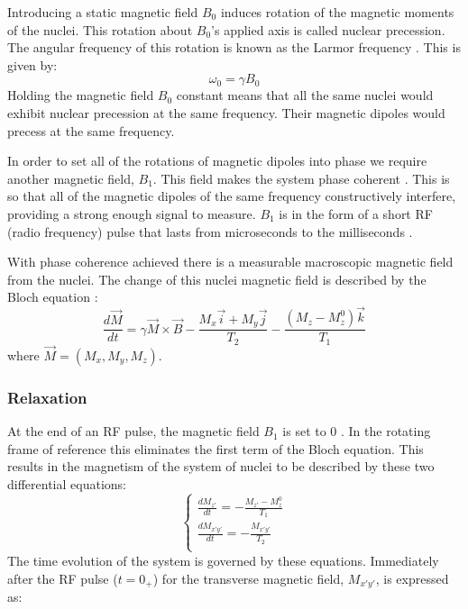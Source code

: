 Introducing a static magnetic field $B_0$ induces rotation of the magnetic moments of the nuclei. This rotation about $B_0$'s applied axis is called nuclear precession. The angular frequency of this rotation is known as the Larmor frequency  \cite{NMRSignalProcessingBook}. This is given by: 
\begin{equation}
    \omega_0 = \gamma B_0
    \label{ref:LarmorFreq}
\end{equation}
Holding the magnetic field $B_0$ constant means that all the same nuclei would exhibit nuclear precession at the same frequency. Their magnetic dipoles would precess at the same frequency.

In order to set all of the rotations of magnetic dipoles into phase we require another magnetic field, $B_1$. This field makes the system phase coherent  \cite{NMRSignalProcessingBook}. This is so that all of the magnetic dipoles of the same frequency constructively interfere, providing a strong enough signal to measure. $B_1$ is in the form of a short RF (radio frequency) pulse that lasts from microseconds to the milliseconds  \cite{NMRSignalProcessingBook}.

With phase coherence achieved there is a measurable macroscopic magnetic field from the nuclei. The change of this nuclei magnetic field is described by the Bloch equation  \cite{NMRSignalProcessingBook}:
\begin{equation}
    \frac{d\vec{M}}{dt} = \gamma \vec{M} \times \vec{B} - \frac{M_{x}\vec{i} + M_{y}\vec{j}}{T_2} - \frac{(M_z - M_{z}^0)\vec{k}}{T_1}
    \label{eq:blochEquation}
\end{equation}
where $\vec{M} = (M_x, M_y, M_z)$.
\subsubsection{Relaxation}

At the end of an RF pulse, the magnetic field $B_1$ is set to 0  \cite{NMRSignalProcessingBook}. In the rotating frame of reference this eliminates the first term of the Bloch equation. This results in the magnetism of the system of nuclei to be described by these two differential equations:
\begin{equation}
    \begin{cases}
          \frac{dM_{z'}}{dt}    =         -\frac{M_{z'} - M_{z}^0}{T_1}  \\
           \frac{dM_{x'y'}}{dt}    =         -\frac{M_{x'y'}}{T_2}  \\         
    \end{cases}
\end{equation}
The time evolution of the system is governed by these equations. Immediately after the RF pulse ($t = 0_+$) for the transverse magnetic field, $M_{x'y'}$, is expressed as:

